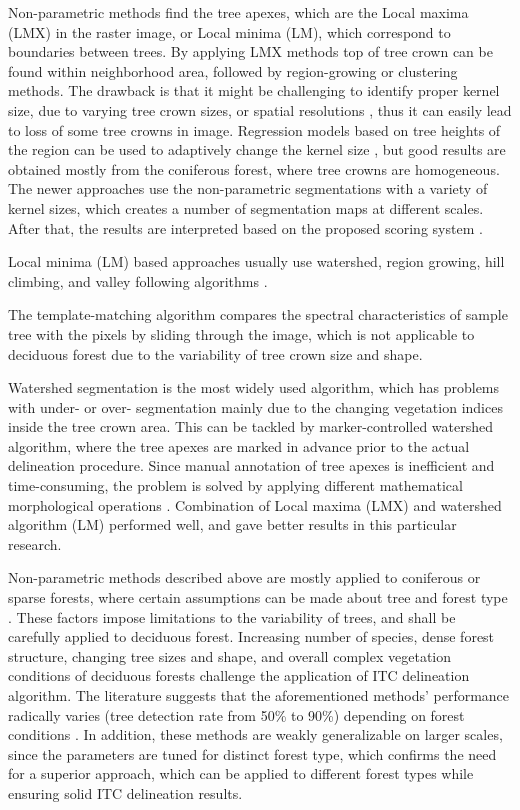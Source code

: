 Non-parametric methods find the tree apexes, which are the Local maxima (\gls{LMX}) in the raster image, or Local minima (\gls{LM}), which correspond to boundaries between trees. By applying \gls{LMX} methods top of tree crown can be found within neighborhood area, followed by region-growing or clustering methods. The drawback is that it might be challenging to identify proper kernel size, due to varying tree crown sizes, or spatial resolutions \cite{Jing}, thus it can easily lead to loss of some tree crowns in image. Regression models based on tree heights of the region can be used to adaptively change the kernel size \cite{Hamraz2016}, but good results are obtained mostly from the coniferous forest, where tree crowns are homogeneous. The newer approaches use the non-parametric segmentations with a variety of kernel sizes, which creates a number of segmentation maps at different scales. After that, the results are interpreted based on the proposed scoring system \cite{Hamraz2016}.

Local minima (\gls{LM}) based approaches usually use watershed, region growing, hill climbing, and valley following algorithms \cite{Mosin2019, Gomes2018}. 

The template-matching algorithm compares the spectral characteristics of sample tree with the pixels by sliding through the image, which is not applicable to deciduous forest due to the variability of tree crown size and shape. 

Watershed segmentation is the most widely used algorithm, which has problems with under- or over- segmentation mainly due to the changing vegetation indices inside the tree crown area. This can be tackled by marker-controlled watershed algorithm, where the tree apexes are marked in advance prior to the actual delineation procedure. Since manual annotation of tree apexes is inefficient and time-consuming, the problem is solved by applying different mathematical morphological operations \cite{Hamraz2016}. Combination of Local maxima (\gls{LMX}) and watershed algorithm (LM) performed well, and gave better results in this particular research.

Non-parametric methods described above are mostly applied to coniferous or sparse forests, where certain assumptions can be made about tree and forest type \cite{Zaforemska2019}. These factors impose limitations to the variability of trees, and shall be carefully applied to deciduous forest. Increasing number of species, dense forest structure, changing tree sizes and shape, and overall complex vegetation conditions of deciduous forests challenge the application of \gls{ITC} delineation algorithm. The literature suggests that the aforementioned methods' performance radically varies (tree detection rate from 50\% to 90\%) depending on forest conditions \cite{Hamraz2016}. In addition, these methods are weakly generalizable on larger scales, since the parameters are tuned for distinct forest type, which confirms the need for a superior approach, which can be applied to different forest types while ensuring solid \gls{ITC} delineation results.

